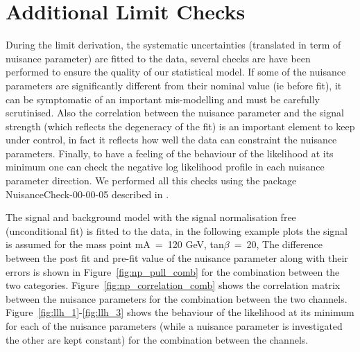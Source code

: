 \clearpage

\section{Additional Limit Checks}
During the limit derivation, the systematic uncertainties (translated in term of nuisance parameter) are fitted to the data,
several checks are have been performed to ensure the quality of our statistical model.
If some of the nuisance parameters are significantly different from their nominal value 
(ie before fit), it can be symptomatic of an important mis-modelling and must be carefully scrutinised.
Also the correlation between the nuisance parameter and the signal strength (which reflects the degeneracy of the fit) 
is an important element to keep under control, in fact it reflects how well the data can constraint the nuisance parameters.
Finally, to have a feeling of the behaviour of the likelihood at its minimum one can check 
the negative log likelihood profile in each nuisance parameter direction. 
We performed all this checks using the package NuisanceCheck-00-00-05 described in \cite{NPcheck}.

The signal and background model with the signal normalisation free (unconditional fit) is fitted to the data,
in the following example plots the signal is assumed for the mass point mA~=~120 GeV, tan$\beta$~=~20,  
The difference between the post fit and pre-fit value of the nuisance parameter along with their errors is shown in Figure~\ref{fig:np_pull_comb}
for the combination between the two categories.
Figure~\ref{fig:np_correlation_comb} shows the correlation matrix between the nuisance parameters for the combination between the two channels.
Figure~\ref{fig:llh_1}-\ref{fig:llh_3} shows the behaviour of the likelihood at its minimum for 
each of the nuisance parameters (while a nuisance parameter is investigated the other are kept constant) for the combination between the channels.

